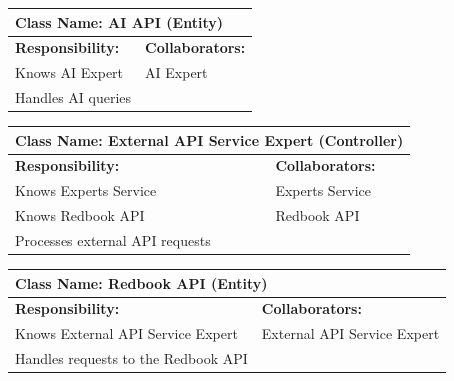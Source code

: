 \documentclass[]{article}
\begin{document}
\begin{table}[H]
  \centering
  \renewcommand{\arraystretch}{1.3} %
  \begin{tabular}{|p{7.5cm}|p{7.5cm}|}
    \hline
    \multicolumn{2}{|l|}{\textbf{Class Name: AI API (Entity)}} \\
    \hline
    \textbf{Responsibility:} & \textbf{Collaborators:}           \\
    \hline
    Knows AI Expert          & AI Expert                         \\
    Handles AI queries       &                                   \\
    \hline
  \end{tabular}
\end{table}
\begin{table}[H]
  \centering
  \renewcommand{\arraystretch}{1.3} %
  \begin{tabular}{|p{7.5cm}|p{7.5cm}|}
    \hline
    \multicolumn{2}{|l|}{\textbf{Class Name: External API Service Expert (Controller)}} \\
    \hline
    \textbf{Responsibility:}        & \textbf{Collaborators:}                           \\
    \hline
    Knows Experts Service           & Experts Service                                   \\
    Knows Redbook API               & Redbook API                                       \\
    Processes external API requests &                                                   \\
    \hline
  \end{tabular}
\end{table}
\begin{table}[H]
  \centering
  \renewcommand{\arraystretch}{1.3} %
  \begin{tabular}{|p{7.5cm}|p{7.5cm}|}
    \hline
    \multicolumn{2}{|l|}{\textbf{Class Name: Redbook API (Entity)}} \\
    \hline
    \textbf{Responsibility:}            & \textbf{Collaborators:}     \\
    \hline
    Knows External API Service Expert   & External API Service Expert \\
    Handles requests to the Redbook API &                             \\
    \hline
  \end{tabular}
\end{table}
\end{document}

